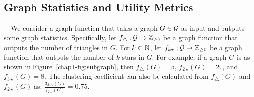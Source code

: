 


\subsection{Graph Statistics and Utility Metrics}
\label{chap1-sub:graph_statistics}

~~We consider a graph function that takes a graph $G \in \mathcal{G}$ as input and outputs some graph statistics. 
Specifically, 
let $f_\triangle: \mathcal{G} \rightarrow \mathbb{Z}_{\ge0}$ be a graph function that outputs the number of triangles in $G$. 
For $k \in \mathbb{N}$, let $f_{k\star}: \mathcal{G} \rightarrow \mathbb{Z}_{\ge0}$ be a graph function that outputs the number of $k$-stars in $G$. 
For example, if a graph $G$ is as shown in Figure~\ref{chap1-fig:subgraph}, then $f_\triangle(G) = 5$, $f_{2\star}(G) = 20$, and $f_{3\star}(G) = 8$. The clustering coefficient can also be calculated from $f_\triangle(G)$ and $f_{2\star}(G)$ as: $\frac{3 f_\triangle(G)}{f_{2\star}(G)} = 0.75$. 


